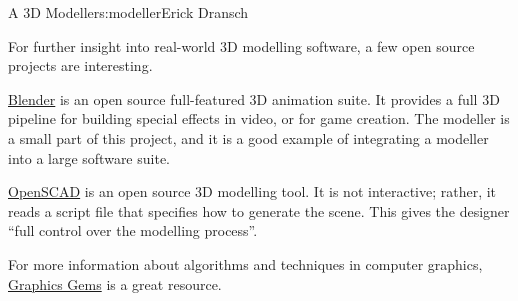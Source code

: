 \begin{aosachapter}{A 3D Modeller}{s:modeller}{Erick Dransch}
\label{further-exploration}

For further insight into real-world 3D modelling software, a few open
source projects are interesting.

\href{http://www.blender.org/}{Blender} is an open source full-featured
3D animation suite. It provides a full 3D pipeline for building special
effects in video, or for game creation. The modeller is a small part of
this project, and it is a good example of integrating a modeller into a
large software suite.

\href{http://www.openscad.org/}{OpenSCAD} is an open source 3D modelling
tool. It is not interactive; rather, it reads a script file that
specifies how to generate the scene. This gives the designer ``full
control over the modelling process''.

For more information about algorithms and techniques in computer
graphics, \href{http://tog.acm.org/resources/GraphicsGems/}{Graphics
Gems} is a great resource.

\end{aosachapter}
